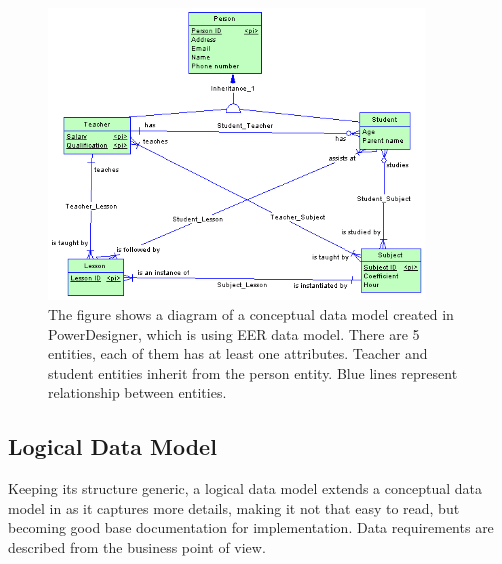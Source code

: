 \begin{figure}[H]
	\centering
	\includegraphics[width=10cm]{../img/Conceptual_Model_PowerDesigner}
	\caption[Conceptual diagram\cite{PowerDesignerDocumentation}]{The figure shows a diagram of a conceptual data model created in PowerDesigner, which is using EER data model. There are 5 entities, each of them has at least one attributes. Teacher and student entities inherit from the person entity. Blue lines represent relationship between entities.}
	\label{CDM}
\end{figure}

\subsection{Logical Data Model}

Keeping its structure generic, a logical data model extends a conceptual data model in as it captures more details, making it not that easy to read, but becoming good base documentation for implementation. Data requirements are described from the business point of view.

